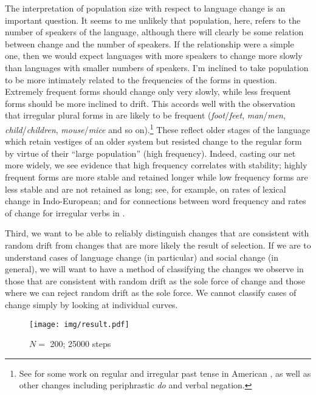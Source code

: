 \documentclass[output=paper]{langsci/langscibook}
\begin{document}
The interpretation of population size with respect to language change
is an important question.  It seems to me unlikely that population,
here, refers to the number of speakers of the language, although there
will clearly be some relation between change and the number of
speakers.  If the relationship were a simple one, then we would expect
languages with more speakers to change more slowly than languages with
smaller numbers of speakers.  I'm inclined to take population to be
more intimately related to the frequencies of the forms in question.
Extremely frequent forms should change only very slowly, while less
frequent forms should be more inclined to drift.  This accords well
with the observation that irregular plural forms in  are likely
to be frequent (\emph{foot}/\emph{feet}, \emph{man}/\emph{men},
\emph{child}/\emph{children}, \emph{mouse}/\emph{mice} and so on).\footnote{See
\citet{newberry-etal:2017} for some work on regular and irregular past tense in
American , as well as other changes including periphrastic
\emph{do} and verbal negation.}  These reflect older stages of the language
which retain vestiges of an older system but resisted change to the regular
form by virtue of their ``large population'' (high frequency).  Indeed, casting
our net more widely, we see evidence that high frequency correlates with
stability; highly frequent forms are more stable and retained longer while low
frequency forms are less stable and are not retained as long;  see, for
example, \citet{pagel-etal:2007} on rates of lexical change in Indo-European;
\citet{lieberman-etal:2007} and \citet{newberry-etal:2017} for connections
between word frequency and rates of change for irregular verbs in
.

Third, we want to be able to reliably distinguish changes that are
consistent with random drift from changes that are more likely the
result of selection.  If we are to understand cases of language change
(in particular) and social change (in general), we will want to have
a method of classifying the changes we observe in those that are
consistent with random drift as the sole force of change and those
where we can reject random drift as the sole force.   We cannot
classify cases of change simply by looking at individual curves.

\begin{figure}
    \texttt{[image: img/result.pdf]}
    \caption{$N=$ \num{200}; \num{25000} steps\label{RandomDrift}}
\end{figure}
\end{document}

